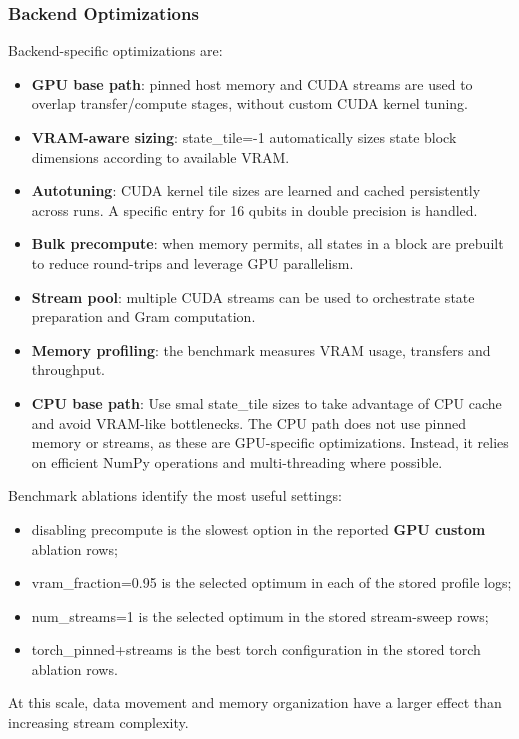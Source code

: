 \documentclass[10pt,twocolumn,letterpaper]{article}
\begin{document}
\subsubsection{Backend Optimizations}
Backend-specific optimizations are:
\begin{itemize}
    \item \textbf{GPU base path}: pinned host memory and CUDA streams are used to overlap transfer/compute stages, without custom CUDA kernel tuning.
    \item \textbf{VRAM-aware sizing}: state\_tile=-1 automatically sizes state block dimensions 
    according to available VRAM.
    \item \textbf{Autotuning}: CUDA kernel tile sizes are learned and cached persistently across runs.
     A specific entry for 16 qubits in double precision is handled.
    \item \textbf{Bulk precompute}: when memory permits, all states in a block are prebuilt to reduce round-trips and leverage GPU parallelism.
    \item \textbf{Stream pool}: multiple CUDA streams can be used to orchestrate state preparation and Gram computation.
    \item \textbf{Memory profiling}: the benchmark measures VRAM usage, transfers and throughput.
    \item \textbf{CPU base path}: Use smal state\_tile sizes to take advantage of CPU cache and avoid VRAM-like bottlenecks.
     The CPU path does not use pinned memory or streams, as these are GPU-specific optimizations.
     Instead, it relies on efficient NumPy operations and multi-threading where possible.
\end{itemize}

Benchmark ablations identify the most useful settings:
\begin{itemize}
    \item disabling precompute is the slowest option in the reported \textbf{GPU custom} ablation rows;
    \item vram\_fraction=0.95 is the selected optimum in each of the stored profile logs;
    \item num\_streams=1 is the selected optimum in the stored stream-sweep rows;
    \item torch\_pinned+streams is the best torch configuration in the stored torch ablation rows.
\end{itemize}

At this scale, data movement and memory organization have a larger effect than increasing stream complexity.
\end{document}
